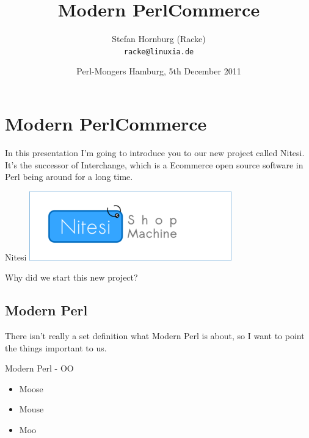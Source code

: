 
\usepackage[T1]{fontenc}
\usepackage{mathptmx}
\usepackage[scaled=.90]{helvet}
\usepackage{courier}

\usepackage{beamerthemesplit}
\usepackage{verbatim}
\usepackage{hyperref}
\usepackage{listings}
\lstset{language=Perl,basicstyle=\footnotesize,tabsize=3,showstringspaces=false}

\title{Modern PerlCommerce}
\author[racke]{Stefan Hornburg (Racke)\\ \texttt{racke@linuxia.de}}
\date[]{Perl-Mongers Hamburg, 5th December 2011}


\maketitle{}

\begin{frame}
  \titlepage
\end{frame}

\tableofcontents

\section{Modern PerlCommerce}
In this presentation I'm going to introduce you to our new project
called Nitesi. It's the successor of Interchange, which is a Ecommerce
open source software in Perl being around for a long time.

\begin{frame}{Nitesi}
  \includegraphics{nitesi.png}
\end{frame}

Why did we start this new project?

\subsection{Modern Perl}
There isn't really a set definition what Modern Perl is about,
so I want to point the things important to us.

\begin{frame}{Modern Perl - OO}
\begin{itemize}
\item Moose
\item Mouse
\item Moo
\end{itemize}
\end{frame}

